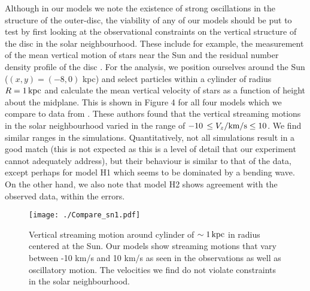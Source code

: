 \documentclass[useAMS,usenatbib]{mnras}
\begin{document}
Although in our models we note the existence of strong oscillations in the structure of the outer-disc, the viability of any of our models should be put to test by first looking at the observational constraints on the vertical structure of the disc in the solar neighbourhood. These include for example, the measurement of the mean vertical motion of stars near the Sun \citep{widrow12, williams13,carlin13} and the residual number density profile of the disc \citep{widrow12,ferguson17}. For the analysis, we position ourselves around the Sun ($(x,y)=(-8, 0)$ kpc) and select particles within a cylinder of radius $R=1\,\rm{kpc}$ and calculate the mean vertical velocity of stars as a function of height about the midplane. This is shown in Figure 4 for all four models which we compare to data from \cite{widrow12}. 
These authors found that the vertical streaming motions in the solar neighbourhood varied in the range of $-10\, \leq V_{z}/\rm{km/s}\leq10 $. We find similar ranges in the simulations. Quantitatively, not all simulations result in a good match (this is not expected as this is a level of detail that our experiment cannot adequately address), but their behaviour is similar to that of the data, except perhaps for model H1 which seems to be dominated by a bending wave. On the other hand, we also note that model H2 shows agreement with the observed data, within the errors.


\begin{figure}
\texttt{[image: ./Compare\_sn1.pdf]}
\caption[]{Vertical streaming motion around cylinder of $\sim1 \,\rm{kpc}$ in radius centered at the Sun. Our models show streaming motions that vary between -10 km/s and 10 km/s as seen in the observations as well as oscillatory motion. The velocities we find do not violate constraints in the solar neighbourhood.}
\end{figure}
\end{document}
